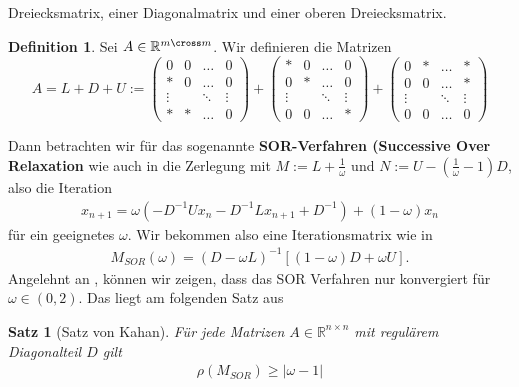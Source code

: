 \documentclass[smallheadings]{scrartcl}
\newtheorem{theorem}{Satz}
\theoremstyle{definition}
\newtheorem{definition}{Definition}[section]
\begin{document}
			Dreiecksmatrix, einer Diagonalmatrix und einer oberen Dreiecksmatrix.
			\begin{definition}
			Sei $A\in \mathbb{R}^{m\cross m}$.  Wir definieren die Matrizen
			$$A=L+D+U:=\begin{pmatrix}
			0&0&\hdots &0\\
			*&0&\hdots &0\\
			\vdots &&\ddots &\vdots\\
			*&*&\hdots &0
			\end{pmatrix}+\begin{pmatrix}
			*&0&\hdots &0\\
			0&*&\hdots &0\\
			\vdots &&\ddots &\vdots\\
			0&0&\hdots &*
			\end{pmatrix}+\begin{pmatrix}
			0&*&\hdots &*\\
			0&0&\hdots &*\\
			\vdots &&\ddots &\vdots\\
			0&0&\hdots &0
			\end{pmatrix}$$
			
			\end{definition}
			
			Dann betrachten wir für das sogenannte \textbf{SOR-Verfahren (Successive 
			Over Relaxation} wie auch in \citep{skrpit} die Zerlegung  mit
			$M:=L+\frac{1}{\omega}$ und $N:=U-(\frac{1}{\omega} -1)D$,  also die 
			Iteration 
			\begin{align}\label{sor_iteration}
			x_{n+1}=\omega (-D^{-1}Ux_n-D^{-1}Lx_{n+1}+D^{-1})+(1-\omega )x_n
			\end{align}
			für ein geeignetes $\omega$.
			Wir bekommen also eine Iterationsmatrix wie in \citep{konvergenz}
			\begin{align*}
			M_{SOR}(\omega )=(D-\omega L)^{-1}[(1-\omega)D+\omega U].
			\end{align*}
			Angelehnt an \citep{konvergenz}, können wir zeigen,  dass das SOR Verfahren nur konvergiert für $\omega \in (0,2)$. Das liegt am folgenden Satz aus \citep{kovergenz}
			
			\begin{theorem}[Satz von Kahan]
			Für jede Matrizen $A\in \mathbb{R}^{n\times n }$ mit regulärem Diagonalteil $D$ gilt 
			\begin{align}\label{omegabetween02}
			\rho (M_{SOR} )\geq |\omega -1|
			\end{align}
			\end{theorem}
			
\end{document}
